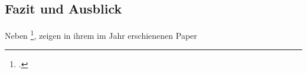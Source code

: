 \documentclass[12pt,ngerman,parskip=half]{scrbook}
\begin{document}


\frontmatter

\tableofcontents

\listoffigures

\listoftables

\mainmatter













\begin{refsection}
\chapter{Fazit und Ausblick}

\blindtext

Neben \footcite{Knuth1980},  \cite{Duesentrieb:2023} zeigen \citeauthor{Dziarmaga2003} in ihrem im Jahr \citeyear{Dziarmaga2003} erschienenen Paper 

\printbibliography[title={Genutzte Literatur}]
\end{refsection}


\printbibliography[title={Bücher},type=book]

\printbibliography[title={Artikel},type=article]

\printbibliography[title={Nicht publiziert},type=unpublished]
\end{document}
